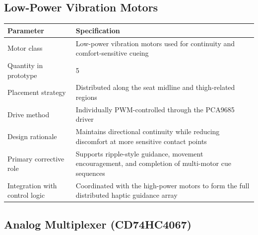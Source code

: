 \documentclass[11pt, a4paper]{article}
\begin{document}
\subsection{Low-Power Vibration Motors}
\label{app:motor_low}

\begin{table}[H]
    \centering
    \footnotesize
    \begin{tabular}{p{} p{}}
        \toprule
        \textbf{Parameter} & \textbf{Specification} \\
        \midrule
        Motor class & Low-power vibration motors used for continuity and comfort-sensitive cueing \\
        Quantity in prototype & 5 \\
        Placement strategy & Distributed along the seat midline and thigh-related regions \\
        Drive method & Individually PWM-controlled through the PCA9685 driver \\
        Design rationale & Maintains directional continuity while reducing discomfort at more sensitive contact points \\
        Primary corrective role & Supports ripple-style guidance, movement encouragement, and completion of multi-motor cue sequences \\
        Integration with control logic & Coordinated with the high-power motors to form the full distributed haptic guidance array \\
        \bottomrule
    \end{tabular}
\end{table}

\subsection{Analog Multiplexer (CD74HC4067)}
\label{app:multiplexer}
\end{document}

